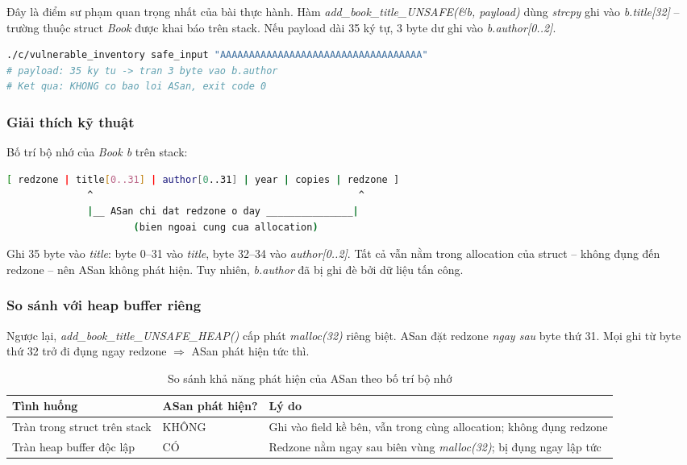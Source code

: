 Đây là điểm sư phạm quan trọng nhất của bài thực hành. Hàm
\textit{add\_book\_title\_UNSAFE(\&b, payload)} dùng \textit{strcpy} ghi vào
\textit{b.title[32]} -- trường thuộc struct \textit{Book} được khai báo trên
stack. Nếu payload dài 35 ký tự, 3 byte dư ghi vào \textit{b.author[0..2]}.

\begin{lstlisting}[language=bash, caption={Tràn struct -- chế độ mặc định (safe\_input)}]
./c/vulnerable_inventory safe_input "AAAAAAAAAAAAAAAAAAAAAAAAAAAAAAAAAAA"
# payload: 35 ky tu -> tran 3 byte vao b.author
# Ket qua: KHONG co bao loi ASan, exit code 0
\end{lstlisting}

\subsubsection{Giải thích kỹ thuật}

Bố trí bộ nhớ của \textit{Book b} trên stack:

\begin{lstlisting}[language=bash, caption={Bố trí bộ nhớ struct Book trên stack}]
[ redzone | title[0..31] | author[0..31] | year | copies | redzone ]
              ^                                              ^
              |__ ASan chi dat redzone o day _______________|
                      (bien ngoai cung cua allocation)
\end{lstlisting}

Ghi 35 byte vào \textit{title}: byte 0--31 vào \textit{title}, byte 32--34 vào
\textit{author[0..2]}. Tất cả vẫn nằm trong allocation của struct -- không
đụng đến redzone -- nên ASan không phát hiện. Tuy nhiên, \textit{b.author}
đã bị ghi đè bởi dữ liệu tấn công.

\subsubsection{So sánh với heap buffer riêng}

Ngược lại, \textit{add\_book\_title\_UNSAFE\_HEAP()} cấp phát \textit{malloc(32)}
riêng biệt. ASan đặt redzone \emph{ngay sau} byte thứ 31. Mọi ghi từ byte thứ
32 trở đi đụng ngay redzone $\Rightarrow$ ASan phát hiện tức thì.

\begin{table}[H]
\centering
\begin{tabularx}{\textwidth}{|X|p{2.5cm}|p{4cm}|}
\hline
\textbf{Tình huống} & \textbf{ASan phát hiện?} & \textbf{Lý do} \\ \hline
Tràn trong struct trên stack & KHÔNG & Ghi vào field kề bên, vẫn trong cùng allocation; không đụng redzone \\ \hline
Tràn heap buffer độc lập & CÓ & Redzone nằm ngay sau biên vùng \textit{malloc(32)}; bị đụng ngay lập tức \\ \hline
\end{tabularx}
\caption{So sánh khả năng phát hiện của ASan theo bố trí bộ nhớ}
\end{table}

